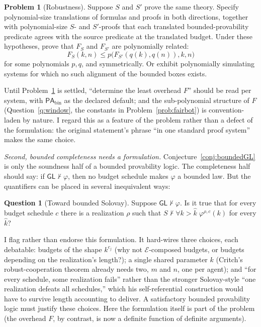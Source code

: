 \documentclass[11pt]{amsart}
\theoremstyle{plain}
\theoremstyle{definition}
\newtheorem{problem}[theorem]{Problem}
\newtheorem{question}[theorem]{Question}
\newcommand{\PAbin}{\mathsf{PA}_{\mathrm{bin}}}
\newcommand{\GL}{\mathsf{GL}}
\begin{document}
\begin{problem}[Robustness]
\label{prob:robust}
Suppose $S$ and $S'$ prove the same theory. Specify polynomial-size translations of formulas and proofs in both directions, together with polynomial-size $S$- and $S'$-proofs that each translated bounded-provability predicate agrees with the source predicate at the translated budget. Under these hypotheses, prove that $F_S$ and $F_{S'}$ are polynomially related:
\[
F_S(k,n)\le p\bigl(F_{S'}(q(k),q(n)),k,n\bigr)
\]
for some polynomials $p,q$, and symmetrically. Or exhibit polynomially simulating systems for which no such alignment of the bounded boxes exists.
\end{problem}

Until Problem~\ref{prob:robust} is settled, ``determine the least overhead $F$'' should be read per system, with $\PAbin$ as the declared default; and the sub-polynomial structure of $F$ (Question~\ref{q:window}, the constants in Problem~\ref{prob:fairbot}) is convention-laden by nature. I regard this as a feature of the problem rather than a defect of the formulation: the original statement's phrase ``in one standard proof system'' makes the same choice.

\emph{Second, bounded completeness needs a formulation.} Conjecture~\ref{conj:boundedGL} is only the soundness half of a bounded provability logic. The completeness half should say: if $\GL \nvdash \varphi$, then no budget schedule makes $\varphi$ a bounded law. But the quantifiers can be placed in several inequivalent ways:

\begin{question}[Toward bounded Solovay]
\label{q:solovay}
Suppose $\GL \nvdash \varphi$. Is it true that for every budget schedule $c$ there is a realization $\rho$ such that $S \nvdash \forall k>\hat{k}\;\varphi^{\rho,c}(k)$ for every $\hat{k}$?
\end{question}

I flag rather than endorse this formulation. It hard-wires three choices, each debatable: budgets of the shape $k^{c_j}$ (why not $\mathcal{E}$-composed budgets, or budgets depending on the realization's length?); a single shared parameter $k$ (Critch's robust-cooperation theorem already needs two, $m$ and $n$, one per agent); and ``for every schedule, some realization fails'' rather than the stronger Solovay-style ``one realization defeats all schedules,'' which his self-referential construction would have to survive length accounting to deliver. A satisfactory bounded provability logic must justify these choices. Here the formulation itself is part of the problem (the overhead $F$, by contrast, is now a definite function of definite arguments).
\end{document}
